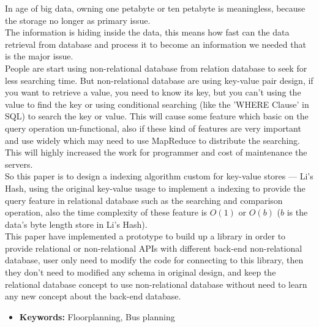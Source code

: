 
In age of big data, owning one petabyte or ten petabyte is meaningless, because the storage no longer as primary issue.\\

The information is hiding inside the data, this means how fast can the data retrieval from database and process it to become an information we needed that is the major issue.\\

People are start using non-relational database from relation database to seek for less searching time. But non-relational database are using key-value pair design, if you want to retrieve a value, you need to know its key, but you can't using the value to find the key or using conditional searching (like the 'WHERE Clause' in SQL) to search the key or value. This will cause some feature which basic on the query operation un-functional, also if these kind of features are very important and use widely which may need to use MapReduce to distribute the searching. This will highly increased the work for programmer and cost of maintenance the servers.\\

So this paper is to design a indexing algorithm custom for key-value stores --- Li's Hash, using the original key-value usage to implement a indexing to provide the query feature in relational database such as the searching and comparison operation, also the time complexity of these feature is $O(1)$ or $O(b)$ ($b$ is the data's byte length store in Li's Hash).\\

This paper have implemented a prototype to build up a library in order to provide relational or non-relational APIs with different back-end non-relational database, user only need to modify the code for connecting to this library, then they don't need to modified any schema in original design, and keep the relational database concept to use non-relational database without need to learn any new concept about the back-end database.\\


\begin{itemize}
\item {\bf Keywords:} Floorplanning, Bus planning
\end{itemize}



